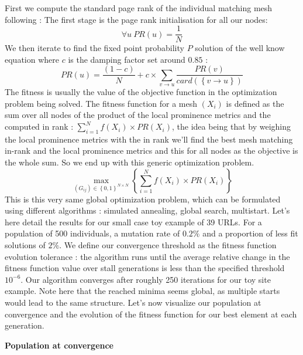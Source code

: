 \documentclass{iSWAGArticle}
\begin{document}
  First we compute the standard page rank of the individual matching mesh following \cite{page_rank} :
  The first stage is the page rank initialisation for all our nodes:
  \begin{equation}
  \forall u \ PR\left(u\right)=\frac{1}{N}
  \end{equation} 
  We then iterate to find the fixed point probability $P$ solution of the well know equation where $c$ is the damping factor set around $0.85$ :
  \begin{equation}
  PR\left(u\right)= \frac{\left(1-c\right)}{N} + c \times \sum_{v \rightarrow u}\frac{PR\left(v\right)}{card\left(\left\{v\rightarrow u\right\}\right)}
  \end{equation}
  The fitness is usually the value of the objective function in the optimization problem being solved.
  The fitness function for a mesh $\left(X_i\right)$ is defined as the sum over all nodes of the product of the local prominence metrics
  and the computed in rank : $\sum^{N}_{i=1} f\left(X_i\right)\times PR(X_i)$, the idea being that by weighing the local prominence metrics with the in rank
  we'll find the best mesh matching in-rank and the local prominence metrics and this for all nodes as the objective is the whole sum. 
  So we end up with this generic optimization problem.
  \begin{equation}
  \max_{\left(G_{ij}\right)  \in \left\{0,1\right\}^{N\times N}}\left\{ \sum^{N}_{i=1} f\left(X_i\right)\times PR(X_i)\right\}
  \end{equation}
  This is this very same global optimization problem, which can be formulated using different algorithms : simulated annealing, global search, multistart.
  Let's here detail the results for our small case toy example of 39 URLs.
  For a population of 500 individuals, a mutation rate of $0.2 \%$ and a proportion of less fit solutions of $2\%$.
  We define our convergence threshold as the fitness function evolution tolerance : the algorithm runs until the average relative change in the fitness function value over stall generations is less than the specified 
  threshold $10^{-6}$.
  Our algorithm converges after roughly 250 iterations for our toy site example. Note here that the reached minima seems global, as multiple starts
  would lead to the same structure.
  Let's now visualize our population at convergence and the evolution of the fitness function for our best element at each generation.
  \begin{center}
  \textbf{\large Population at convergence}
  \end{center}
\end{document}
